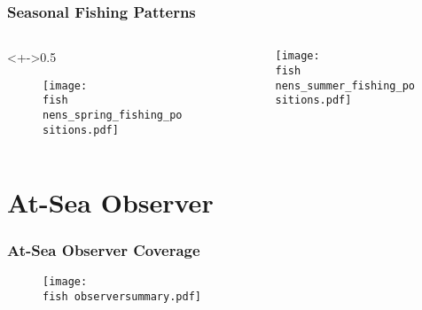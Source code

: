 \documentclass{beamer}
\begin{document}
\begin{frame}
\frametitle{Seasonal Fishing Patterns}

\begin{columns}
\begin{column}<+->{0.5\textwidth}
 \vspace*{-0.5cm}
\begin{figure}
\centerline{\texttt{[image: \\fish nens\_spring\_fishing\_positions.pdf]}}

\end{figure}
\end{column}

\begin{column}{0.5\textwidth}
\begin{figure}
 \vspace*{-0.5cm}

\centerline{\texttt{[image: \\fish nens\_summer\_fishing\_positions.pdf]}}

 \end{figure}

\end{column}
\end{columns}

\end{frame}



\section{At-Sea Observer}



\begin{frame}
\frametitle{At-Sea Observer Coverage}
\begin{figure}
		
\vspace*{-.5cm}
\centerline{\texttt{[image: \\fish observersummary.pdf]}}
		
\end{figure}
\end{frame}



\end{document}
